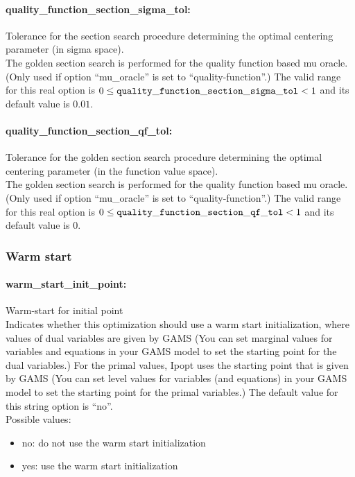 \paragraph{quality\_function\_section\_sigma\_tol:} Tolerance for the section search procedure determining the optimal centering parameter (in sigma space). $\;$ \\
 The golden section search is performed for the
quality function based mu oracle. (Only used if
option ``mu\_oracle'' is set to ``quality-function''.) The valid range for this real option is 
$0 \le {\tt quality\_function\_section\_sigma\_tol } <  1$
and its default value is $0.01$.


\paragraph{quality\_function\_section\_qf\_tol:} Tolerance for the golden section search procedure determining the optimal centering parameter (in the function value space). $\;$ \\
 The golden section search is performed for the
quality function based mu oracle. (Only used if
option ``mu\_oracle'' is set to ``quality-function''.) The valid range for this real option is 
$0 \le {\tt quality\_function\_section\_qf\_tol } <  1$
and its default value is $0$.


\subsubsection{Warm start}

\paragraph{warm\_start\_init\_point:} Warm-start for initial point $\;$ \\
 Indicates whether this optimization should use a warm start initialization, where values of dual variables are given by GAMS (You can set marginal values for variables and equations in your GAMS model to set the starting point for the dual variables.)
For the primal values, Ipopt uses the starting point that is given by GAMS (You can set level values for variables (and equations) in your GAMS model to set the starting point for the primal variables.)
The default value for this string option is ``no''.
\\ 
Possible values:
\begin{itemize}
   \item no: do not use the warm start initialization
   \item yes: use the warm start initialization
\end{itemize}


